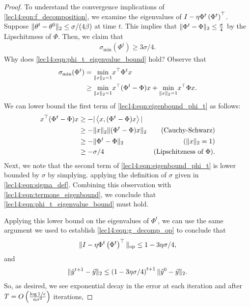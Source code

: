 \begin{proof}
To understand the convergence implications of \eqref{lec14:eqn:f_decomposition}, we examine the eigenvalues of \linebreak $I - \eta \Phi^t \left(\Phi^t\right)^\top$. Suppose $\|\theta^t - \theta^0\|_2 \leq \sigma/(4\beta)$ at time $t$. This implies that $\|\Phi^t - \Phi\|_2 \leq \frac{\sigma}{4}$ by the Lipschitzness of $\Phi$. Then, we claim that 
\begin{align}
    \sigma_{\text{min}}(\Phi^t) \geq 3\sigma/4. \label{lec14:eqn:phi_t_eigenvalue_bound}
\end{align}
Why does \eqref{lec14:eqn:phi_t_eigenvalue_bound} hold? Observe that
\begin{align}
    \sigma_\text{min}(\Phi^t) &= \underset{\|x\|_2=1}{\text{min}} x^\top \Phi^tx \\
   &\geq \underset{\|x\|_2=1}{\text{min}} x^\top (\Phi^t - \Phi)x + \underset{\|x\|_2=1}{\text{min}}  x^\top \Phi x. \label{lec14:eqn:eigenbound_phi_t}
\end{align}
We can lower bound the first term of \eqref{lec14:eqn:eigenbound_phi_t} as follows:
\begin{align}
    x^\top (\Phi^t - \Phi)x &\geq -|\left<x, (\Phi^t - \Phi)x\right>| \\
    &\geq -\|x\|_2 \|(\Phi^t - \Phi)x\|_2 &\text{(Cauchy-Schwarz)}\\ 
    &\geq -\|\Phi^t - \Phi\|_2 &\text{($\|x\|_2 = 1$)}\\ 
    &\geq -\sigma/4 &\text{(Lipschitzness of $\Phi$)}. \label{lec14:eqn:termone_eigenbound}
\end{align}
Next, we note that the second term of \eqref{lec14:eqn:eigenbound_phi_t} is lower bounded by $\sigma$ by simplying. applying the definition of $\sigma$ given in \eqref{lec14:eqn:sigma_def}. Combining this observation with \eqref{lec14:eqn:termone_eigenbound}, we conclude that \eqref{lec14:eqn:phi_t_eigenvalue_bound} must hold.

Applying this lower bound on the eigenvalues of $\Phi^t$, we can use the same argument we used to establish \eqref{lec14:eqn:g_decomp_op} to conclude that
\begin{align}
    \|I - \eta \Phi^t \left(\Phi^t\right)^\top\|_{\text{op}} \leq 1 - 3\eta \sigma/4 \label{lec14:eqn:op_norm_bound},
\end{align}
and 
\begin{align}
    \|\hat{y}^{t+1} - \vec{y}\|_{2} \leq \left(1 - 3\eta \sigma/4\right)^{t+1} \|\hat{y}^{0} - \vec{y}\|_{2}.
\end{align}
So, as desired, we see exponential decay in the error at each iteration and after $T = O \left( \frac{\log 1/\epsilon}{n\sigma^2}\right)$ iterations,


\end{proof}
